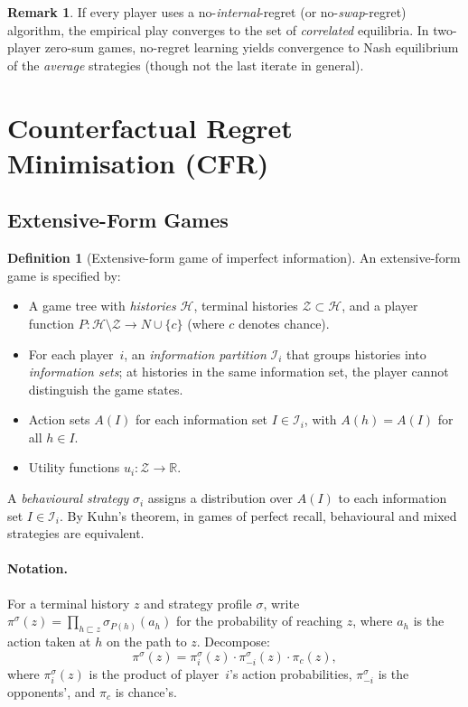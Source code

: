 \documentclass[11pt,a4paper]{article}
\theoremstyle{plain}
\theoremstyle{definition}
\newtheorem{definition}[theorem]{Definition}
\newtheorem{remark}[theorem]{Remark}
\newcommand{\R}{\mathbb{R}}
\newcommand{\cH}{\mathcal{H}}
\newcommand{\cI}{\mathcal{I}}
\newcommand{\cZ}{\mathcal{Z}}
\begin{document}
\begin{remark}
If every player uses a no-\emph{internal}-regret (or no-\emph{swap}-regret)
algorithm, the empirical play converges to the set of \emph{correlated}
equilibria.  In two-player zero-sum games, no-regret learning yields
convergence to Nash equilibrium of the \emph{average} strategies (though
not the last iterate in general).
\end{remark}

\section{Counterfactual Regret Minimisation (CFR)}\label{sec:cfr}

\subsection{Extensive-Form Games}

\begin{definition}[Extensive-form game of imperfect information]
An extensive-form game is specified by:
\begin{itemize}
  \item A game tree with \emph{histories} $\cH$, terminal histories
    $\cZ \subset \cH$, and a player function $P : \cH\setminus\cZ \to
    N \cup \{c\}$ (where $c$ denotes chance).
  \item For each player~$i$, an \emph{information partition} $\cI_i$
    that groups histories into \emph{information sets}; at histories in
    the same information set, the player cannot distinguish the game
    states.
  \item Action sets $A(I)$ for each information set $I \in \cI_i$, with
    $A(h) = A(I)$ for all $h \in I$.
  \item Utility functions $u_i : \cZ \to \R$.
\end{itemize}
\end{definition}

A \emph{behavioural strategy} $\sigma_i$ assigns a distribution over
$A(I)$ to each information set $I \in \cI_i$.  By Kuhn's theorem, in
games of perfect recall, behavioural and mixed strategies are equivalent.

\paragraph{Notation.}  For a terminal history $z$ and strategy profile
$\sigma$, write $\pi^\sigma(z) = \prod_{h \sqsubset z} \sigma_{P(h)}(a_h)$
for the probability of reaching $z$, where $a_h$ is the action taken at
$h$ on the path to $z$.  Decompose:
\[
  \pi^\sigma(z) = \pi_i^\sigma(z)\cdot \pi_{-i}^\sigma(z)\cdot \pi_c(z),
\]
where $\pi_i^\sigma(z)$ is the product of player~$i$'s action
probabilities, $\pi_{-i}^\sigma$ is the opponents', and $\pi_c$ is
chance's.
\end{document}
